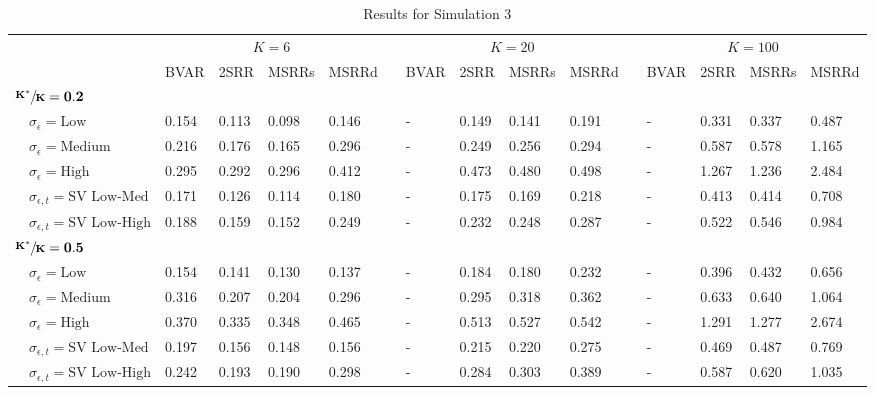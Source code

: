 \begin{table}[!tbp]
\caption{Results for Simulation 3\label{s1_table}} 
\begin{center}
\begin{tabular}{lllllcllllcllll}
\hline\hline
\multicolumn{1}{l}{\bfseries }&\multicolumn{4}{c}{\bfseries $K=6$}&\multicolumn{1}{c}{\bfseries }&\multicolumn{4}{c}{\bfseries $K=20$}&\multicolumn{1}{c}{\bfseries }&\multicolumn{4}{c}{\bfseries $K=100$}\tabularnewline
\cline{2-5} \cline{7-10} \cline{12-15}
\multicolumn{1}{l}{}&\multicolumn{1}{c}{BVAR}&\multicolumn{1}{c}{2SRR}&\multicolumn{1}{c}{MSRRs}&\multicolumn{1}{c}{MSRRd}&\multicolumn{1}{c}{}&\multicolumn{1}{c}{BVAR}&\multicolumn{1}{c}{2SRR}&\multicolumn{1}{c}{MSRRs}&\multicolumn{1}{c}{MSRRd}&\multicolumn{1}{c}{}&\multicolumn{1}{c}{BVAR}&\multicolumn{1}{c}{2SRR}&\multicolumn{1}{c}{MSRRs}&\multicolumn{1}{c}{MSRRd}\tabularnewline
\hline
{\bfseries $\mathbf{\sfrac{K^*}{K}=0.2}$}&&&&&&&&&&&&&&\tabularnewline
~~$\sigma_{\epsilon} =\text{Low}$& 0.154& 0.113& 0.098& 0.146&&-& 0.149& 0.141& 0.191&&-& 0.331& 0.337& 0.487\tabularnewline
~~$\sigma_{\epsilon} =\text{Medium}$& 0.216& 0.176& 0.165& 0.296&&-& 0.249& 0.256& 0.294&&-& 0.587& 0.578& 1.165\tabularnewline
~~$\sigma_{\epsilon} =\text{High}$& 0.295& 0.292& 0.296& 0.412&&-& 0.473& 0.480& 0.498&&-& 1.267& 1.236& 2.484\tabularnewline
~~$\sigma_{\epsilon,t} = \text{SV Low-Med}$& 0.171& 0.126& 0.114& 0.180&&-& 0.175& 0.169& 0.218&&-& 0.413& 0.414& 0.708\tabularnewline
~~$\sigma_{\epsilon,t}  = \text{SV Low-High}$& 0.188& 0.159& 0.152& 0.249&&-& 0.232& 0.248& 0.287&&-& 0.522& 0.546& 0.984\tabularnewline
\hline
{\bfseries $\mathbf{\sfrac{K^*}{K}=0.5}$}&&&&&&&&&&&&&&\tabularnewline
~~$\sigma_{\epsilon} =\text{Low}$& 0.154& 0.141& 0.130& 0.137&&-& 0.184& 0.180& 0.232&&-& 0.396& 0.432& 0.656\tabularnewline
~~$\sigma_{\epsilon} =\text{Medium}$& 0.316& 0.207& 0.204& 0.296&&-& 0.295& 0.318& 0.362&&-& 0.633& 0.640& 1.064\tabularnewline
~~$\sigma_{\epsilon} =\text{High}$& 0.370& 0.335& 0.348& 0.465&&-& 0.513& 0.527& 0.542&&-& 1.291& 1.277& 2.674\tabularnewline
~~$\sigma_{\epsilon,t} = \text{SV Low-Med}$& 0.197& 0.156& 0.148& 0.156&&-& 0.215& 0.220& 0.275&&-& 0.469& 0.487& 0.769\tabularnewline
~~$\sigma_{\epsilon,t}  = \text{SV Low-High}$& 0.242& 0.193& 0.190& 0.298&&-& 0.284& 0.303& 0.389&&-& 0.587& 0.620& 1.035\tabularnewline

\end{tabular}
\end{center}
\end{table}
